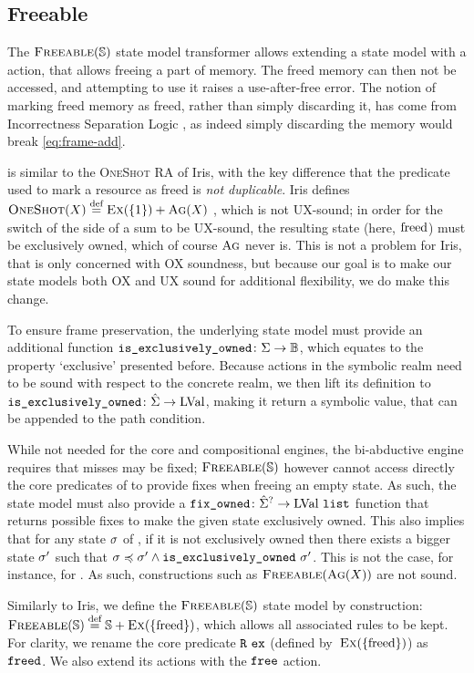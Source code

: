 \subsection{Freeable}

The $\textsc{Freeable}(\mathbb S)$ state model transformer allows extending a state model with a \free{} action, that allows freeing a part of memory. The freed memory can then not be accessed, and attempting to use it raises a use-after-free error. The notion of marking freed memory as freed, rather than simply discarding it, has come from Incorrectness Separation Logic \cite{isl}, as indeed simply discarding the memory would break \ref{eq:frame-add}.

\Freeable{} is similar to the \textsc{OneShot} RA of Iris, with the key difference that the \freedP{} predicate used to mark a resource as freed is \emph{not duplicable}. Iris defines $\textsc{OneShot}(X) \stackrel{\textnormal{def}}= \textsc{Ex}(\{1\}) + \textsc{Ag}(X)$ \cite{iris}, which is not UX-sound; in order for the switch of the side of a sum to be UX-sound, the resulting state (here, $\text{freed}$) must be exclusively owned, which of course $\textsc{Ag}$ never is. This is not a problem for Iris, that is only concerned with OX soundness, but because our goal is to make our state models both OX and UX sound for additional flexibility, we do make this change.

To ensure frame preservation, the underlying state model must provide an additional function ${\texttt{is\_exclusively\_owned}\colon\Sigma\rightarrow\mathbb{B}}$, which equates to the property `exclusive' presented before. Because actions in the symbolic realm need to be sound with respect to the concrete realm, we then lift its definition to ${\texttt{is\_exclusively\_owned}\colon\hat{\Sigma}\rightarrow\text{LVal}}$, making it return a symbolic value, that can be appended to the path condition.

While not needed for the core and compositional engines, the bi-abductive engine requires that  misses may be fixed; $\textsc{Freeable}(\mathbb S)$ however cannot access directly the core predicates of \mmdl{} to provide fixes when freeing an empty state. As such, the state model must also provide a ${\texttt{fix\_owned}\colon\hat{\Sigma}^?\rightarrow\text{LVal}~\texttt{list}}$ function that returns possible fixes to make the given state exclusively owned. This also implies that for any state $\sigma$ of \mmdl{}, if it is not exclusively owned then there exists a bigger state $\sigma'$ such that $\sigma\preccurlyeq\sigma' \land \texttt{is\_exclusively\_owned}~\sigma'$. This is not the case, for instance, for \Ag. As such, constructions such as $\textsc{Freeable}(\textsc{Ag}(X))$ are not sound.

Similarly to Iris, we define the $\textsc{Freeable}(\mathbb S)$ state model by construction: $\textsc{Freeable}(\mathbb S) \stackrel{\textnormal{def}}= \mathbb S + \textsc{Ex}(\{\text{freed}\})$, which allows all associated rules to be kept. For clarity, we rename the core predicate $\texttt{R}~\texttt{ex}$ (defined by~$\textsc{Ex}(\{\text{freed}\})$) as $\texttt{freed}$. We also extend its actions with the $\texttt{free}$ action.

